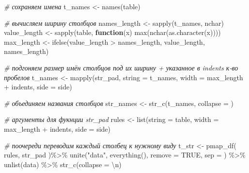 \documentclass[
]{book}
\newenvironment{Shaded}{\begin{snugshade}}{\end{snugshade}}
\newcommand{\AttributeTok}[1]{\textcolor[rgb]{0.77,0.63,0.00}{#1}}
\newcommand{\CommentTok}[1]{\textcolor[rgb]{0.56,0.35,0.01}{\textit{#1}}}
\newcommand{\ConstantTok}[1]{\textcolor[rgb]{0.00,0.00,0.00}{#1}}
\newcommand{\ControlFlowTok}[1]{\textcolor[rgb]{0.13,0.29,0.53}{\textbf{#1}}}
\newcommand{\FunctionTok}[1]{\textcolor[rgb]{0.00,0.00,0.00}{#1}}
\newcommand{\NormalTok}[1]{#1}
\newcommand{\OtherTok}[1]{\textcolor[rgb]{0.56,0.35,0.01}{#1}}
\newcommand{\SpecialCharTok}[1]{\textcolor[rgb]{0.00,0.00,0.00}{#1}}
\newcommand{\StringTok}[1]{\textcolor[rgb]{0.31,0.60,0.02}{#1}}
\begin{document}
\begin{Shaded}
\begin{Highlighting}[]
  \CommentTok{\# сохраняем имена}
\NormalTok{  t\_names      }\OtherTok{\textless{}{-}} \FunctionTok{names}\NormalTok{(table)}
  
  \CommentTok{\# вычисляем ширину столбцов}
\NormalTok{  names\_length }\OtherTok{\textless{}{-}} \FunctionTok{sapply}\NormalTok{(t\_names, nchar) }
\NormalTok{  value\_length }\OtherTok{\textless{}{-}} \FunctionTok{sapply}\NormalTok{(table, }\ControlFlowTok{function}\NormalTok{(x) }\FunctionTok{max}\NormalTok{(}\FunctionTok{nchar}\NormalTok{(}\FunctionTok{as.character}\NormalTok{(x))))}
\NormalTok{  max\_length   }\OtherTok{\textless{}{-}} \FunctionTok{ifelse}\NormalTok{(value\_length }\SpecialCharTok{\textgreater{}}\NormalTok{ names\_length, value\_length, names\_length)}
  
  \CommentTok{\# подгоняем размер имён столбцов под их ширину + указанное в indents к{-}во пробелов }
\NormalTok{  t\_names }\OtherTok{\textless{}{-}} \FunctionTok{mapply}\NormalTok{(str\_pad, }
                    \AttributeTok{string =}\NormalTok{ t\_names, }
                    \AttributeTok{width  =}\NormalTok{ max\_length }\SpecialCharTok{+}\NormalTok{ indents, }
                    \AttributeTok{side   =}\NormalTok{ side)}
  
  \CommentTok{\# объединяем названия столбцов}
\NormalTok{  str\_names }\OtherTok{\textless{}{-}} \FunctionTok{str\_c}\NormalTok{(t\_names, }\AttributeTok{collapse =} \StringTok{\textquotesingle{}\textquotesingle{}}\NormalTok{)}
  
  \CommentTok{\# аргументы для фукнции str\_pad}
\NormalTok{  rules }\OtherTok{\textless{}{-}} \FunctionTok{list}\NormalTok{(}\AttributeTok{string =}\NormalTok{ table, }\AttributeTok{width =}\NormalTok{ max\_length }\SpecialCharTok{+}\NormalTok{ indents, }\AttributeTok{side =}\NormalTok{ side)}
  
  \CommentTok{\# поочереди переводим каждый столбец к нужному виду}
\NormalTok{  t\_str }\OtherTok{\textless{}{-}}   \FunctionTok{pmap\_df}\NormalTok{( rules, str\_pad )}\SpecialCharTok{\%\textgreater{}\%}
    \FunctionTok{unite}\NormalTok{(}\StringTok{"data"}\NormalTok{, }\FunctionTok{everything}\NormalTok{(), }\AttributeTok{remove =} \ConstantTok{TRUE}\NormalTok{, }\AttributeTok{sep =} \StringTok{\textquotesingle{}\textquotesingle{}}\NormalTok{) }\SpecialCharTok{\%\textgreater{}\%}
    \FunctionTok{unlist}\NormalTok{(data) }\SpecialCharTok{\%\textgreater{}\%}
    \FunctionTok{str\_c}\NormalTok{(}\AttributeTok{collapse =} \StringTok{\textquotesingle{}}\SpecialCharTok{\textbackslash{}n}\StringTok{\textquotesingle{}}\NormalTok{) }
  

\end{Highlighting}
\end{Shaded}
\end{document}

